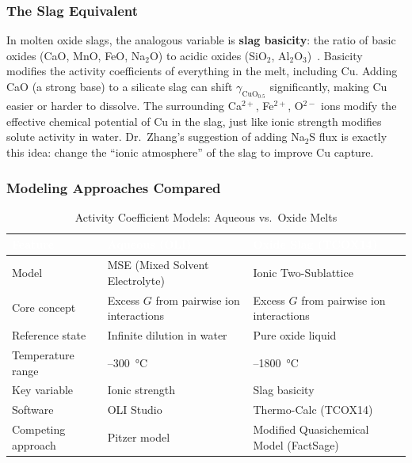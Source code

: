 \documentclass[11pt]{article}
\begin{document}
\subsubsection{The Slag Equivalent}

In molten oxide slags, the analogous variable is \textbf{slag basicity}: the ratio of basic oxides (CaO, MnO, FeO, Na$_2$O) to acidic oxides (SiO$_2$, Al$_2$O$_3$)~\cite{Seetharaman2005}. Basicity modifies the activity coefficients of everything in the melt, including Cu. Adding CaO (a strong base) to a silicate slag can shift $\gamma_{\text{CuO}_{0.5}}$ significantly, making Cu easier or harder to dissolve. The surrounding Ca$^{2+}$, Fe$^{2+}$, O$^{2-}$ ions modify the effective chemical potential of Cu in the slag, just like ionic strength modifies solute activity in water. Dr.\ Zhang's suggestion of adding Na$_2$S flux is exactly this idea: change the ``ionic atmosphere'' of the slag to improve Cu capture.

\subsubsection{Modeling Approaches Compared}

\begin{table}[H]
\caption{Activity Coefficient Models: Aqueous vs.\ Oxide Melts}
\label{tab:models_compared}
\centering
\renewcommand{\arraystretch}{1.3}
\begin{tabular}{|>{\raggedright\arraybackslash}p{1.6in}|>{\raggedright\arraybackslash}p{2.1in}|>{\raggedright\arraybackslash}p{2.1in}|}
\hline
\rowcolor{headercolor}
\textcolor{white}{\textbf{Feature}} & \textcolor{white}{\textbf{Aqueous (OLI)}} & \textcolor{white}{\textbf{Oxide Slag (TCOX14)}} \\
\hline
Model & MSE (Mixed Solvent Electrolyte) & Ionic Two-Sublattice \\
\hline
\rowcolor{altrow}
Core concept & Excess $G$ from pairwise ion interactions & Excess $G$ from pairwise ion interactions \\
\hline
Reference state & Infinite dilution in water & Pure oxide liquid \\
\hline
\rowcolor{altrow}
Temperature range & 25--\SI{300}{\celsius} & 1200--\SI{1800}{\celsius} \\
\hline
Key variable & Ionic strength & Slag basicity \\
\hline
\rowcolor{altrow}
Software & OLI Studio & Thermo-Calc (TCOX14) \\
\hline
Competing approach & Pitzer model & Modified Quasichemical Model (FactSage) \\
\hline
\end{tabular}
\end{table}
\end{document}

